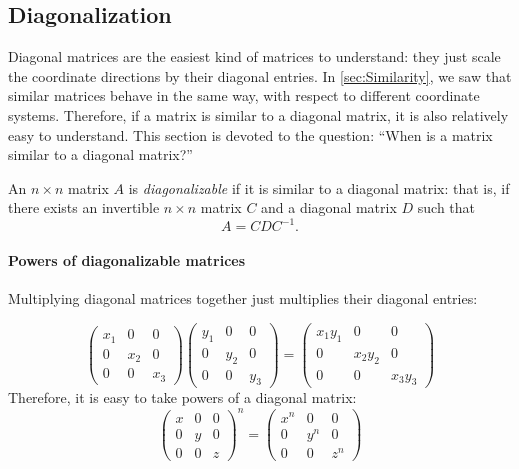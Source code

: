 \documentclass[a4paper,12pt]{article}
\begin{document}
\newpage
\subsection{Diagonalization}Diagonal matrices are the easiest kind of matrices to understand: they just scale the coordinate directions by their diagonal entries. In \ref{sec:Similarity}, we saw that similar matrices behave in the same way, with respect to different coordinate systems. Therefore, if a matrix is similar to a diagonal matrix, it is also relatively easy to understand. This section is devoted to the question: “When is a matrix similar to a diagonal matrix?”

\begin{tcolorbox}[title=Definition,colframe=blue!70!black, colback=blue!5!white]
An \(n \times n\) matrix \(A\) is \textit{diagonalizable} if it is similar to a diagonal matrix: that is, if there exists an invertible \(n \times n\) matrix \(C\) and a diagonal matrix \(D\) such that
\[
A = C D C^{-1}.
\]

\end{tcolorbox}

\paragraph{Powers of diagonalizable matrices}Multiplying diagonal matrices together just multiplies their diagonal entries:

\[
\begin{pmatrix}
    x_1 & 0 & 0\\
    0 & x_2 & 0\\
    0 & 0 & x_3
\end{pmatrix}
\begin{pmatrix}
    y_1 & 0 & 0\\
    0 & y_2 & 0\\
    0 & 0 & y_3
\end{pmatrix} = 
\begin{pmatrix}
    x_1y_1 & 0 & 0\\
    0 & x_2y_2 & 0\\
    0 & 0 & x_3y_3
\end{pmatrix}
\]
Therefore, it is easy to take powers of a diagonal matrix:
\[
\begin{pmatrix}
    x & 0 & 0\\
    0 & y & 0\\
    0 & 0 & z
\end{pmatrix}^n = \begin{pmatrix}
    x^n & 0 & 0\\
    0 & y^n & 0\\
    0 & 0 & z^n
\end{pmatrix}
\]
\end{document}

